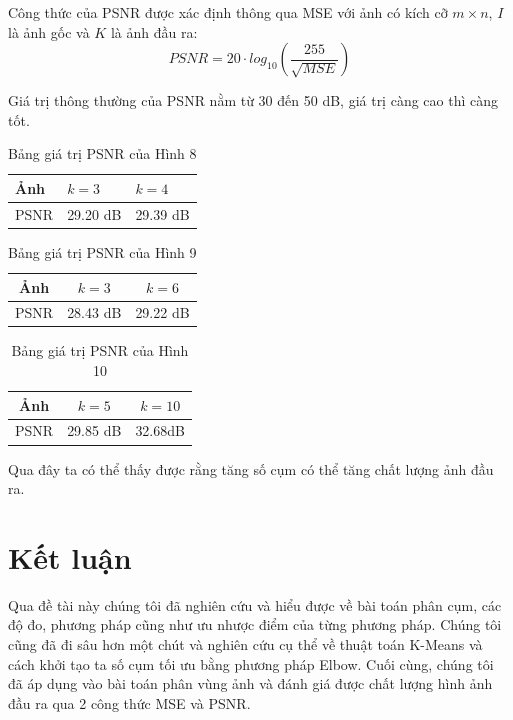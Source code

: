 \documentclass{article}
\begin{document}
    Công thức của PSNR được xác định thông qua MSE với ảnh có kích cỡ $m \times n$, $I$ là ảnh gốc và $K$ là ảnh đầu ra:
    $$PSNR = 20 \cdot log_{10}\left( \frac{255}{\sqrt{MSE}} \right)$$

    Giá trị thông thường của PSNR nằm từ 30 đến 50 dB, giá trị càng cao thì càng tốt.

    \begin{table}[H]
        \centering
        \begin{tabular}{l|l|l}
            Ảnh & $k = 3$ & $k = 4$ \\
            \hline
            PSNR & 29.20 dB & 29.39 dB
        \end{tabular}
        \caption{Bảng giá trị PSNR của Hình 8}
    \end{table}

    \begin{table}[H]
        \centering
        \begin{tabular}{c|c|c}
            Ảnh & $k = 3$ & $k = 6$ \\
            \hline
            PSNR & 28.43 dB & 29.22 dB
        \end{tabular}
        \caption{Bảng giá trị PSNR của Hình 9}
    \end{table}

    \begin{table}[H]
        \centering
        \begin{tabular}{c|c|c}
            Ảnh & $k = 5$ & $k = 10$ \\
            \hline
            PSNR & 29.85 dB & 32.68dB
        \end{tabular}
        \caption{Bảng giá trị PSNR của Hình 10}
    \end{table}

    Qua đây ta có thể thấy được rằng tăng số cụm có thể tăng chất lượng ảnh đầu ra.
    
    \section{Kết luận}
    \label{sec:summary}
    Qua đề tài này chúng tôi đã nghiên cứu và hiểu được về bài toán phân cụm, các độ đo, phương pháp cũng như ưu nhược điểm của từng phương pháp. Chúng tôi cũng đã đi sâu hơn một chút và nghiên cứu cụ thể về thuật toán K-Means và cách khởi tạo ta số cụm tối ưu bằng phương pháp Elbow. Cuối cùng, chúng tôi đã áp dụng vào bài toán phân vùng ảnh và đánh giá được chất lượng hình ảnh đầu ra qua 2 công thức MSE và PSNR.
\end{document}
